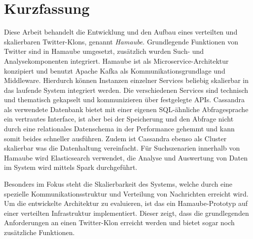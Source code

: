 


\newpage

\chapter*{Kurzfassung}
Diese Arbeit behandelt die Entwicklung und den Aufbau eines verteilten und skalierbaren Twitter-Klons, genannt \textit{Hamaube}. Grundlegende Funktionen von Twitter sind in Hamaube umgesetzt, zusätzlich wurden Such- und Analysekomponenten integriert. Hamaube ist als Microservice-Architektur konzipiert und benutzt Apache Kafka als Kommunikationsgrundlage und Middleware. Hierdurch können Instanzen einzelner Services beliebig skalierbar in das laufende System integriert werden. Die verschiedenen Services sind technisch und thematisch gekapselt und kommunizieren über festgelegte APIs.
 Cassandra als verwendete Datenbank bietet mit einer eigenen SQL-ähnliche Abfragesprache ein vertrautes Interface, ist aber bei der Speicherung und den Abfrage nicht durch eine relationales Datenschema in der Performance gehemmt und kann somit beides schneller ausführen. Zudem ist Cassandra ebenso als Cluster skalierbar was die Datenhaltung vereinfacht. 
Für Suchszenarien innerhalb von Hamaube wird Elasticsearch verwendet, die Analyse und Auswertung von Daten im System wird mittels Spark durchgeführt.

Besonders im Fokus steht die Skalierbarkeit des Systems, welche durch eine spezielle Kommunikationsstruktur und Verteilung von Nachrichten erreicht wird. Um die entwickelte Architektur zu evaluieren, ist das ein Hamaube-Prototyp auf einer verteilten Infrastruktur implementiert. Dieser zeigt, dass die grundlegenden Anforderungen an einen Twitter-Klon erreicht werden und bietet sogar noch zusätzliche Funktionen.




\linespread{1.25}\selectfont

